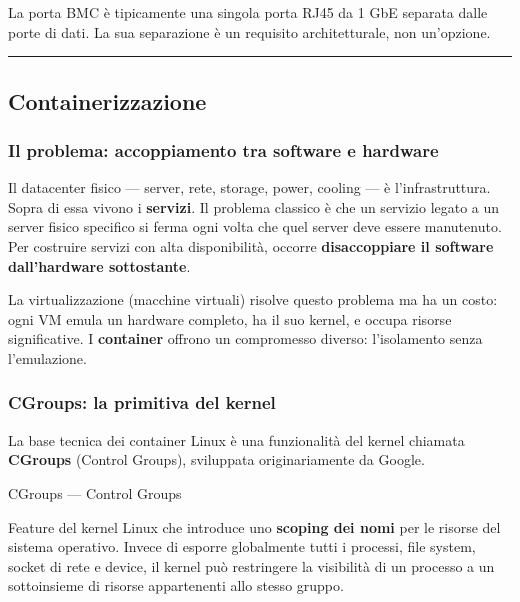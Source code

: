 \documentclass[
  italian,
  openany]{book}
\begin{document}
La porta BMC è tipicamente una singola porta RJ45 da 1 GbE separata
dalle porte di dati. La sua separazione è un requisito architetturale,
non un'opzione.

\begin{center}\rule{0.5\linewidth}{0.5pt}\end{center}

\subsection{Containerizzazione}\label{containerizzazione}

\subsubsection{Il problema: accoppiamento tra software e
hardware}\label{il-problema-accoppiamento-tra-software-e-hardware}

Il datacenter fisico --- server, rete, storage, power, cooling --- è
l'infrastruttura. Sopra di essa vivono i \textbf{servizi}. Il problema
classico è che un servizio legato a un server fisico specifico si ferma
ogni volta che quel server deve essere manutenuto. Per costruire servizi
con alta disponibilità, occorre \textbf{disaccoppiare il software
dall'hardware sottostante}.

La virtualizzazione (macchine virtuali) risolve questo problema ma ha un
costo: ogni VM emula un hardware completo, ha il suo kernel, e occupa
risorse significative. I \textbf{container} offrono un compromesso
diverso: l'isolamento senza l'emulazione.

\subsubsection{CGroups: la primitiva del
kernel}\label{cgroups-la-primitiva-del-kernel}

La base tecnica dei container Linux è una funzionalità del kernel
chiamata \textbf{CGroups} (Control Groups), sviluppata originariamente
da Google.

\begin{calloutdefinition}{CGroups — Control Groups}

Feature del kernel Linux che introduce uno \textbf{scoping dei nomi} per
le risorse del sistema operativo. Invece di esporre globalmente tutti i
processi, file system, socket di rete e device, il kernel può
restringere la visibilità di un processo a un sottoinsieme di risorse
appartenenti allo stesso gruppo.

\end{calloutdefinition}
\end{document}
